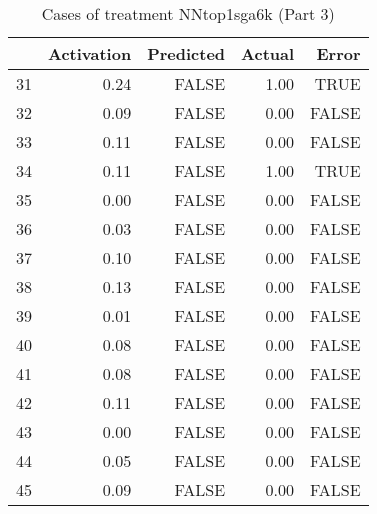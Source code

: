 \begin{table}[ht]
\centering
\begin{tabular}{rrrrr}
  \hline
 & Activation & Predicted & Actual & Error \\ 
  \hline
31 & 0.24 & FALSE & 1.00 & TRUE \\ 
  32 & 0.09 & FALSE & 0.00 & FALSE \\ 
  33 & 0.11 & FALSE & 0.00 & FALSE \\ 
  34 & 0.11 & FALSE & 1.00 & TRUE \\ 
  35 & 0.00 & FALSE & 0.00 & FALSE \\ 
  36 & 0.03 & FALSE & 0.00 & FALSE \\ 
  37 & 0.10 & FALSE & 0.00 & FALSE \\ 
  38 & 0.13 & FALSE & 0.00 & FALSE \\ 
  39 & 0.01 & FALSE & 0.00 & FALSE \\ 
  40 & 0.08 & FALSE & 0.00 & FALSE \\ 
  41 & 0.08 & FALSE & 0.00 & FALSE \\ 
  42 & 0.11 & FALSE & 0.00 & FALSE \\ 
  43 & 0.00 & FALSE & 0.00 & FALSE \\ 
  44 & 0.05 & FALSE & 0.00 & FALSE \\ 
  45 & 0.09 & FALSE & 0.00 & FALSE \\ 
   \hline
\end{tabular}
\caption{Cases of treatment NNtop1sga6k (Part 3)} 
\end{table}
